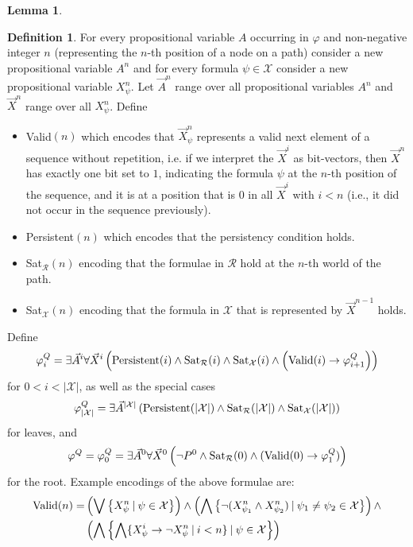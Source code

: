 \documentclass{easychair}
\theoremstyle{definition}
\theoremstyle{definition}
\theoremstyle{definition}
\newtheorem{lemma}[theorem]{Lemma}
\theoremstyle{definition}
\theoremstyle{definition}
\newtheorem{definition}[theorem]{Definition}
\theoremstyle{definition}
\theoremstyle{definition}
\begin{document}
\begin{lemma}
\begin{definition}
For every propositional variable $A$ occurring in $\varphi$ and non-negative integer $n$ (representing the $n$-th position of a node on a path) consider a new propositional variable $A^n$ and for every formula $\psi\in\mathcal X$ consider a new propositional variable $X_\psi^n$.
Let $\vec A^n$ range over all propositional variables $A^n$ and $\vec X^n$ range over all $X_\psi^n$.
Define
	\begin{itemize}
		\item {\normalfont Valid}$(n)$ which encodes that $\vec X^n_\psi$ represents a valid next element of a sequence without repetition, i.e. if we interpret the $\vec X^i$ as bit-vectors, then $\vec X^n$ has exactly one bit set to $1$, indicating the formula $\psi$ at the $n$-th position of the sequence, and it is at a position that is $0$ in all $\vec X^i$ with $i < n$ (i.e., it did not occur in the sequence previously).
		\item {\normalfont Persistent}$(n)$ which encodes that the persistency condition holds.
		\item {\normalfont Sat}$_{\mathcal R}(n)$ encoding that the formulae in $\mathcal R$ hold at the $n$-th world of the path.
		\item {\normalfont Sat}$_{\mathcal X}(n)$ encoding that the formula in $\mathcal X$ that is represented by $\vec X^{n-1}$ holds.
	\end{itemize}
	Define$$\varphi^Q_{i} = \exists \vec A^i\forall \vec X^i\left(\text{\normalfont Persistent}(i)\wedge \text{\normalfont Sat}_{\mathcal R}(i)\wedge \text{\normalfont Sat}_{\mathcal X}(i)\wedge\left(\text{\normalfont Valid}(i)\to \varphi^Q_{i+1}\right)\right)$$
	for $0 < i < |\mathcal{X}|$, as well as the special cases
	$$\varphi^Q_{|\mathcal{X}|} = \exists \vec A^{|\mathcal{X}|}\left(\text{\normalfont Persistent}(|\mathcal{X}|)\wedge \text{\normalfont Sat}_{\mathcal R}(|\mathcal{X}|)\wedge \text{\normalfont Sat}_{\mathcal X}(|\mathcal{X}|)\right)$$
	for leaves, and $$\varphi^Q = \varphi_0^Q = \exists \vec A^0\forall \vec X^0\left(\neg P^0\wedge \text{\normalfont Sat}_{\mathcal R}(0)\wedge(\text{\normalfont Valid}(0)\to \varphi_1^Q)\right)$$for the root.
	Example encodings of the above formulae are:
	\begin{align*}
		\text{\normalfont Valid}(n) = &\left(\bigvee\left\{X^n_\psi\:|\:\psi\in\mathcal X\right\}\right)\wedge\left(\bigwedge \left\{\neg(X^n_{\psi_1}\wedge X^n_{\psi_2})\:|\:\psi_1\neq\psi_2\in\mathcal X\right\}\right)\wedge\\&\left(\bigwedge\left\{\bigwedge\{X^i_\psi\to\neg X^n_\psi\:|\:i < n\}\:|\:\psi\in\mathcal X\right\}\right)\\

\end{align*}
\end{definition}
\end{lemma}
\end{document}

